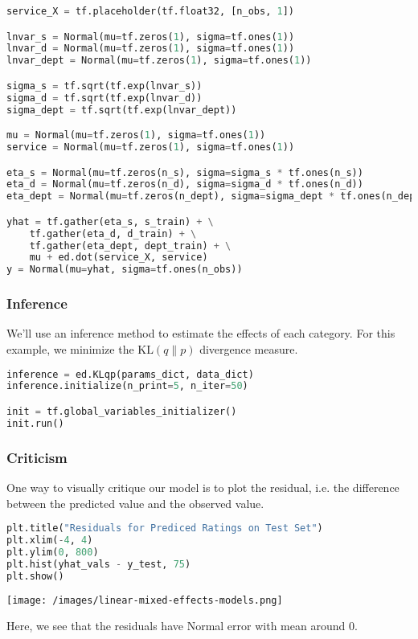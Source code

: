 \begin{lstlisting}[language=Python]
service_X = tf.placeholder(tf.float32, [n_obs, 1])

lnvar_s = Normal(mu=tf.zeros(1), sigma=tf.ones(1))
lnvar_d = Normal(mu=tf.zeros(1), sigma=tf.ones(1))
lnvar_dept = Normal(mu=tf.zeros(1), sigma=tf.ones(1))

sigma_s = tf.sqrt(tf.exp(lnvar_s))
sigma_d = tf.sqrt(tf.exp(lnvar_d))
sigma_dept = tf.sqrt(tf.exp(lnvar_dept))

mu = Normal(mu=tf.zeros(1), sigma=tf.ones(1))
service = Normal(mu=tf.zeros(1), sigma=tf.ones(1))

eta_s = Normal(mu=tf.zeros(n_s), sigma=sigma_s * tf.ones(n_s))
eta_d = Normal(mu=tf.zeros(n_d), sigma=sigma_d * tf.ones(n_d))
eta_dept = Normal(mu=tf.zeros(n_dept), sigma=sigma_dept * tf.ones(n_dept))

yhat = tf.gather(eta_s, s_train) + \
    tf.gather(eta_d, d_train) + \
    tf.gather(eta_dept, dept_train) + \
    mu + ed.dot(service_X, service)
y = Normal(mu=yhat, sigma=tf.ones(n_obs))
\end{lstlisting}

\subsubsection{Inference}

We'll use an inference method to estimate the effects of each category. For this example, we minimize the $\text{KL}(q\|p)$ divergence measure.

\begin{lstlisting}[language=Python]
inference = ed.KLqp(params_dict, data_dict)
inference.initialize(n_print=5, n_iter=50)

init = tf.global_variables_initializer()
init.run()
\end{lstlisting}

\subsubsection{Criticism}

One way to visually critique our model is to plot the residual, i.e. the difference between the predicted value and the observed value.

\begin{lstlisting}[language=Python]
plt.title("Residuals for Prediced Ratings on Test Set")
plt.xlim(-4, 4)
plt.ylim(0, 800)
plt.hist(yhat_vals - y_test, 75)
plt.show()
\end{lstlisting}

\texttt{[image: /images/linear-mixed-effects-models.png]}

Here, we see that the residuals have Normal error with mean around 0.
